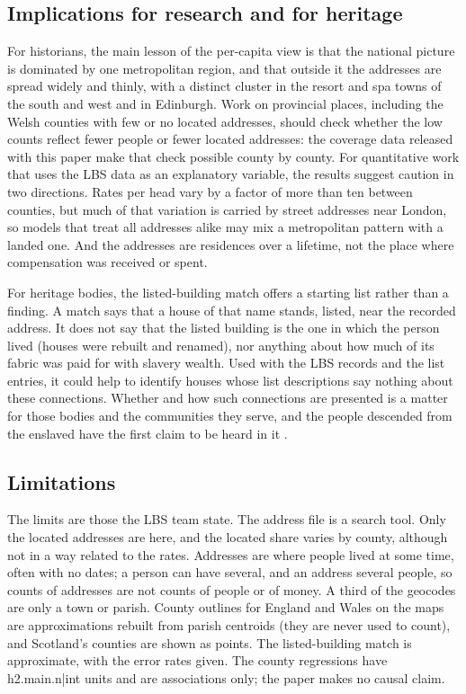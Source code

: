 \documentclass[11pt,a4paper]{article}
\begin{document}
\subsection{Implications for research and for heritage}
For historians, the main lesson of the per-capita view is that the national picture is dominated by one metropolitan region, and that outside it the addresses are spread widely and thinly, with a distinct cluster in the resort and spa towns of the south and west and in Edinburgh. Work on provincial places, including the Welsh counties with few or no located addresses, should check whether the low counts reflect fewer people or fewer located addresses: the coverage data released with this paper make that check possible county by county. For quantitative work that uses the LBS data as an explanatory variable, the results suggest caution in two directions. Rates per head vary by a factor of more than ten between counties, but much of that variation is carried by street addresses near London, so models that treat all addresses alike may mix a metropolitan pattern with a landed one. And the addresses are residences over a lifetime, not the place where compensation was received or spent.

For heritage bodies, the listed-building match offers a starting list rather than a finding. A match says that a house of that name stands, listed, near the recorded address. It does not say that the listed building is the one in which the person lived (houses were rebuilt and renamed), nor anything about how much of its fabric was paid for with slavery wealth. Used with the LBS records and the list entries, it could help to identify houses whose list descriptions say nothing about these connections. Whether and how such connections are presented is a matter for those bodies and the communities they serve, and the people descended from the enslaved have the first claim to be heard in it \citep{beckles2013}.

\subsection{Limitations}
The limits are those the LBS team state. The address file is a search tool. Only the located addresses are here, and the located share varies by county, although not in a way related to the rates. Addresses are where people lived at some time, often with no dates; a person can have several, and an address several people, so counts of addresses are not counts of people or of money. A third of the geocodes are only a town or parish. County outlines for England and Wales on the maps are approximations rebuilt from parish centroids (they are never used to count), and Scotland's counties are shown as points. The listed-building match is approximate, with the error rates given. The county regressions have {{h2.main.n|int}} units and are associations only; the paper makes no causal claim.
\end{document}
